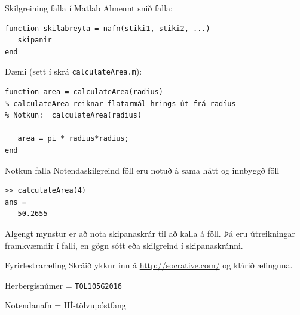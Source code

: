 \documentclass[handout]{beamer}
\begin{document}
\begin{frame}[fragile]{Skilgreining falla í Matlab}
Almennt snið falla:
\begin{verbatim}
function skilabreyta = nafn(stiki1, stiki2, ...)
   skipanir
end
\end{verbatim}
Dæmi (sett í skrá \texttt{calculateArea.m}):
\begin{verbatim}
function area = calculateArea(radius)
% calculateArea reiknar flatarmál hrings út frá radíus
% Notkun:  calculateArea(radius)

   area = pi * radius*radius;
end
\end{verbatim}

\end{frame}

\begin{frame}[fragile]{Notkun falla}
Notendaskilgreind föll eru notuð á sama hátt og innbyggð föll
\begin{verbatim}
>> calculateArea(4)
ans =
   50.2655
\end{verbatim}
Algengt mynstur er að nota skipanaskrár til að kalla á föll. Þá eru útreikningar framkvæmdir í falli, en gögn sótt eða skilgreind í skipanaskránni.
\end{frame}

\begin{frame}{Fyrirlestraræfing}
Skráið ykkur inn á \url{http://socrative.com/} og klárið æfinguna.

Herbergisnúmer = \texttt{TOL105G2016}

Notendanafn = HÍ-tölvupóstfang
\end{frame}
\end{document}
